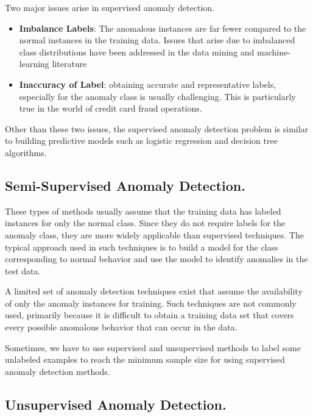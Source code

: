 \documentclass[
]{book}
\begin{document}
Two major issues arise in supervised anomaly detection.

\begin{itemize}
\item
  \textbf{Imbalance Labels}: The anomalous instances are far fewer compared to the normal instances in the training data. Issues that arise
  due to imbalanced class distributions have been addressed in the data mining and
  machine-learning literature
\item
  \textbf{Inaccuracy of Label}: obtaining accurate and representative labels, especially for the anomaly class is usually challenging. This is particularly true in the world of credit card fraud operations.
\end{itemize}

Other than these two issues, the supervised anomaly detection problem is similar to building predictive models such as logistic regression and decision tree algorithms.

\hypertarget{semi-supervised-anomaly-detection.}{%
\subsection{Semi-Supervised Anomaly Detection.}\label{semi-supervised-anomaly-detection.}}

These types of methods usually assume that the training data has labeled instances for only the normal class. Since they do not require labels for the anomaly class, they are more widely applicable than supervised techniques. The typical approach used in such techniques is to build a model for the class corresponding to normal behavior and use the model to identify anomalies in the test data.

A limited set of anomaly detection techniques exist that assume the availability of
only the anomaly instances for training. Such techniques are not commonly used,
primarily because it is difficult to obtain a training data set that covers every
possible anomalous behavior that can occur in the data.

Sometimes, we have to use supervised and unsupervised methods to label some unlabeled examples to reach the minimum sample size for using supervised anomaly detection methods.

\hypertarget{unsupervised-anomaly-detection.}{%
\subsection{Unsupervised Anomaly Detection.}\label{unsupervised-anomaly-detection.}}
\end{document}
